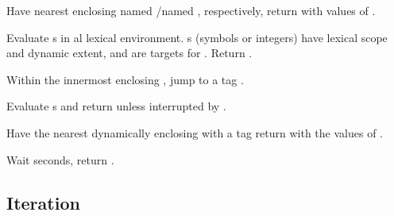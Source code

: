 \begin{LIST}{1cm}
  {
  Have nearest enclosing  named /named \NIL,
  respectively, return with values of .  
  }

  {
  Evaluate s in al lexical environment. s (symbols or integers) have lexical
  scope and dynamic extent, and are targets for . Return
  \retval{\NIL}. 
  }

  {
    Within the innermost enclosing , jump to a tag  .
  }

  {
    Evaluate s and return  unless
    interrupted by . 
  }

  {Have the nearest dynamically
  enclosing  with a tag   return with the
  values of .
  }

  {Wait  seconds, return \retval{\NIL}.
    }

\end{LIST}


\subsection{Iteration}

